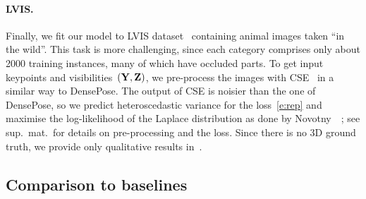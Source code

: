 \paragraph{LVIS.}

Finally, we fit our model to LVIS dataset~\cite{gupta2019lvis} containing animal images taken ``in the wild''.
This task is more challenging, since each category comprises only about 2000 training instances, many of which have occluded parts.
To get input keypoints and visibilities~$(\mathbf{Y},\mathbf{Z})$, we pre-process the images with CSE~\cite{neverova2020continuous} in a similar way to DensePose.
%
%
The output of CSE is noisier than the one of DensePose, so we predict heteroscedastic variance for the loss~\eqref{e:rep} and maximise the log-likelihood of the Laplace distribution as done by Novotny~\etal~\cite{novotny18capturing}; see sup.~mat.~for details on pre-processing and the loss.
Since there is no 3D ground truth, we provide only qualitative results in~.


\subsection{Comparison to baselines}

